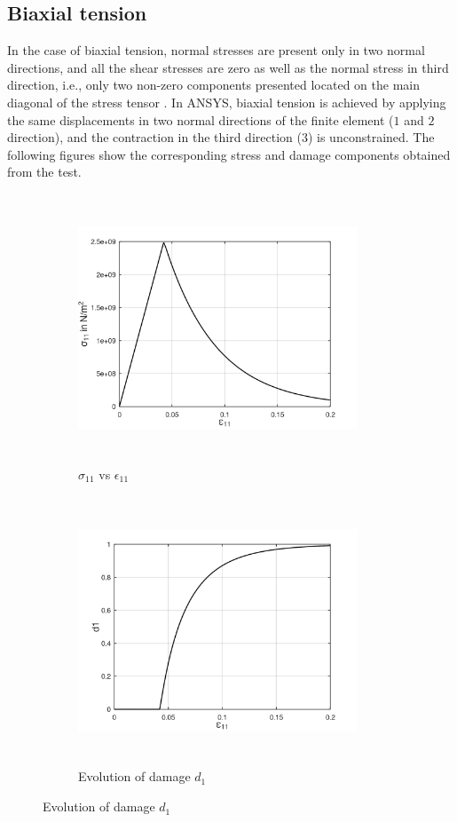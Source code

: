 \documentclass[12pt,openright,twoside]{report}
\begin{document}
\subsection{Biaxial tension}
\indent\indent\indent  In the case of biaxial tension, normal stresses are present only in two normal directions, and all the shear stresses are zero as well as the normal stress in third direction, i.e., only two non-zero components presented located on the main diagonal of the stress tensor \citep{ubt}. In ANSYS, biaxial tension is achieved by applying the same displacements in two normal directions of the finite element ($1$ and $2$ direction), and the contraction in the third direction ($3$) is unconstrained. The following figures show the corresponding stress and damage components obtained from the test.
\begin{figure}[hbt!]
     \captionsetup[subfigure]{justification=centering}
     \begin{subfigure}{0.4\textwidth}
         \includegraphics[width=8.3cm,height=8cm,keepaspectratio]{23.S11vsE11.png}
         \caption{$\sigma_{11}$ vs $\epsilon_{11}$}
         \label{fig:S11vsE11}
     \end{subfigure}
	\hspace{1.8cm}
     \captionsetup[subfigure]{justification=centering}
     \begin{subfigure}{0.4\textwidth}
         \includegraphics[width=8.3cm,height=8cm,keepaspectratio]{23.d1.png}
         \caption{Evolution of damage $d_{1}$}
         \label{fig:Evolution of damage d1}
     \end{subfigure}
\end{figure}
\end{document}
